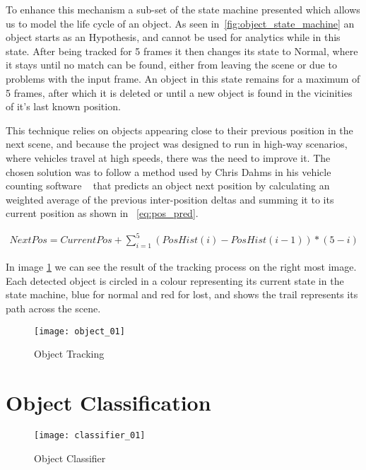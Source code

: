 To enhance this mechanism a sub-set of the state machine presented  which allows us to model the life cycle of an object. As seen in~\ref{fig:object_state_machine} an object starts as an Hypothesis, and cannot be used for analytics while in this state. After being tracked for 5 frames it then changes its state to Normal, where it stays until no match can be found, either from leaving the scene or due to problems with the input frame. An object in this state remains for a maximum of 5 frames, after which it is deleted or until a new object is found in the vicinities of it's last known position.

This technique relies on objects appearing close to their previous position in the next scene, and because the project was designed to run in high-way scenarios, where vehicles travel at high speeds, there was the need to improve it. The chosen solution was to follow a method used by Chris Dahms in his vehicle counting software ~\cite{dahms_opencv_3_car_counting_cpp_2017} that predicts an object next position by calculating an weighted average of the previous inter-position deltas and summing it to its current position as shown in ~\ref{eq:pos_pred}.

\begin{eqnarray}
\label{eq:pos_pred}
NextPos = CurrentPos + \sum_{i=1}^{5} (PosHist(i) - PosHist(i-1)) * (5-i)
\end{eqnarray}

In image \ref{fig:object_tracking} we can see the result of the tracking process on the right most image. Each detected object is circled in a colour representing its current state in the state machine, blue for normal and red for lost, and shows the trail represents its path across the scene. 

\begin{figure}[h]
  \begin{center}
    \leavevmode
    \texttt{[image: object\_01]}
    \caption{Object Tracking}
    \label{fig:object_tracking}
  \end{center}
\end{figure}

\section{Object Classification}

\begin{figure}[h]
  \begin{center}
    \leavevmode
    \texttt{[image: classifier\_01]}
    \caption{Object Classifier}
    \label{fig:object_classifier}
  \end{center}
\end{figure}

